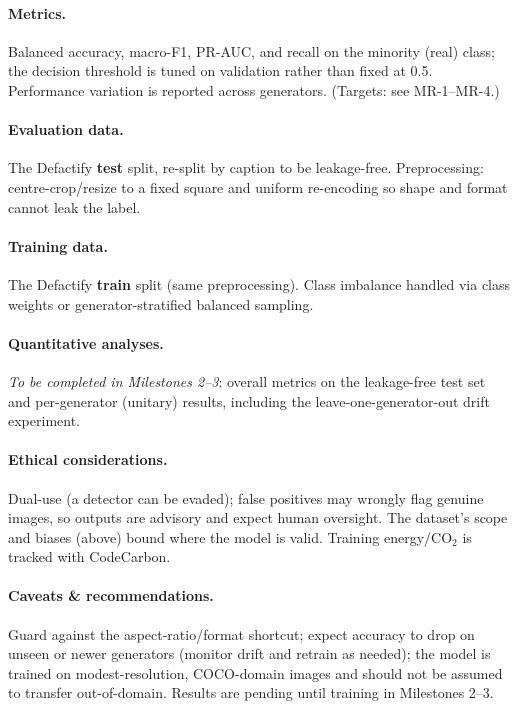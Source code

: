 \documentclass[11pt]{article}
\begin{document}
\paragraph{Metrics.} Balanced accuracy, macro-F1, PR-AUC, and recall on the minority (real) class; the decision threshold is tuned on validation rather than fixed at 0.5. Performance variation is reported across generators. (Targets: see MR-1--MR-4.)

\paragraph{Evaluation data.} The Defactify \textbf{test} split, re-split by caption to be leakage-free. Preprocessing: centre-crop/resize to a fixed square and uniform re-encoding so shape and format cannot leak the label.

\paragraph{Training data.} The Defactify \textbf{train} split (same preprocessing). Class imbalance handled via class weights or generator-stratified balanced sampling.

\paragraph{Quantitative analyses.} \emph{To be completed in Milestones 2--3}: overall metrics on the leakage-free test set and per-generator (unitary) results, including the leave-one-generator-out drift experiment.

\paragraph{Ethical considerations.} Dual-use (a detector can be evaded); false positives may wrongly flag genuine images, so outputs are advisory and expect human oversight. The dataset's scope and biases (above) bound where the model is valid. Training energy/CO$_2$ is tracked with CodeCarbon.

\paragraph{Caveats \& recommendations.} Guard against the aspect-ratio/format shortcut; expect accuracy to drop on unseen or newer generators (monitor drift and retrain as needed); the model is trained on modest-resolution, COCO-domain images and should not be assumed to transfer out-of-domain. Results are pending until training in Milestones 2--3.
\end{document}
